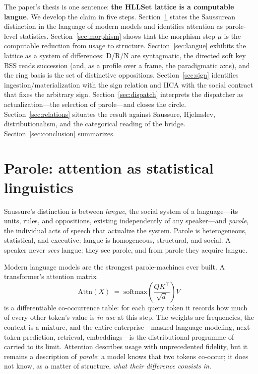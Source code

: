 \documentclass[11pt,a4paper]{article}
\theoremstyle{remark}
\newcommand{\Attn}{\ensuremath{\mathrm{Attn}}}           %
\newcommand{\Ing}{\ensuremath{\mu}}                      %
\begin{document}
The paper's thesis is one sentence: \textbf{the HLLSet lattice is a computable
langue}. We develop the claim in five steps. Section~\ref{sec:parole} states
the Saussurean distinction in the language of modern models and identifies
attention as parole-level statistics. Section~\ref{sec:morphism} shows that
the morphism step $\Ing$ is the computable reduction from usage to structure.
Section~\ref{sec:langue} exhibits the lattice as a system of differences:
D/R/N are syntagmatic, the directed soft key BSS reads succession (and, as a
profile over a frame, the paradigmatic axis), and the ring basis is the set of
distinctive oppositions. Section~\ref{sec:sign} identifies
ingestion/materialization with the sign relation and IICA with the social
contract that fixes the arbitrary sign. Section~\ref{sec:dispatch} interprets
the dispatcher as actualization---the selection of parole---and closes the
circle. Section~\ref{sec:relations} situates the result against Saussure,
Hjelmslev, distributionalism, and the categorical reading of the bridge.
Section~\ref{sec:conclusion} summarizes.

\section{Parole: attention as statistical linguistics}
\label{sec:parole}

Saussure's distinction is between \emph{langue}, the social system of a
language---its units, rules, and oppositions, existing independently of any
speaker---and \emph{parole}, the individual acts of speech that actualize the
system. Parole is heterogeneous, statistical, and executive; langue is
homogeneous, structural, and social. A speaker never \emph{sees} langue; they
see parole, and from parole they acquire langue.

Modern language models are the strongest parole-machines ever built. A
transformer's attention matrix
\[
  \Attn(X) \;=\; \mathrm{softmax}\!\left(\frac{QK^\top}{\sqrt{d}}\right)V
\]
is a differentiable co-occurrence table: for each query token it records how
much of every other token's value is \emph{in use} at this step. The weights
are frequencies, the context is a mixture, and the entire enterprise---masked
language modeling, next-token prediction, retrieval, embeddings---is the
distributional programme of \cite{harris1954,firth1957} carried to its limit.
Attention describes usage with unprecedented fidelity, but it remains a
description of \emph{parole}: a model knows that two tokens co-occur; it does
not know, as a matter of structure, \emph{what their difference consists in}.
\end{document}

